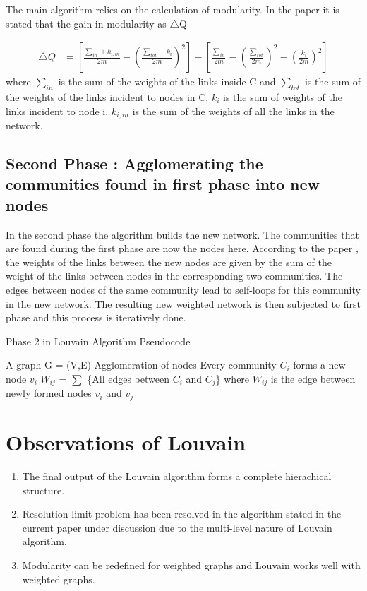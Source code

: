 \par The main algorithm relies on the calculation of modularity.
In the paper it is stated that the gain in modularity as $\bigtriangleup$Q

\begin{equation}
\begin{split}
\bigtriangleup Q &= \left[ \frac{\sum_{in} + k_{i,in}}{2m} - \left( \frac{\sum_{tot} + k_{i}}{2m} \right)^2 \right] - \left[ \frac{\sum_{in}}{2m} - \left( \frac{\sum_{tot}}{2m} \right)^2 - \left( \frac{k_i}{2m} \right)^2 \right]
\end{split}
\end{equation}
where $\sum_{in}$ is the sum of the weights of the links inside C and $\sum_{tot}$ is the sum of the weights of the links incident to nodes in C, $k_i$ is the sum of weights of the links incident to node i, $k_{i,in}$ is the sum of the weights  of all the links in the network.

\subsection{Second Phase : Agglomerating the communities found in first phase into new nodes}
In the second phase the algorithm builds the new network. The communities that are found during the first phase are now the nodes here. According to the paper \cite{Louvain}, the weights of the links between the new nodes are given by the sum of the weight of the links between nodes in the corresponding two communities. The edges between nodes of the same community lead to self-loops for this community in the new network. The resulting new weighted network is then subjected to first phase  and this process is iteratively done. 
\begin{algorithm}[H]

\caption{Phase 2 in Louvain Algorithm Pseudocode}
\begin{algorithmic} 
\REQUIRE A graph G = (V,E)
\ENSURE Agglomeration of nodes
\STATE Every community $C_i$ forms a new node $v_i$
\STATE $W_{ij}$ = $\sum$ \{All edges between $C_i$ and $C_j$\} where $W_{ij}$ is the edge between newly formed nodes $v_i$ and $v_j$
\end{algorithmic}
\end{algorithm}
\section{Observations of Louvain}
\begin{enumerate}
\item The final output of the Louvain algorithm forms a complete hierachical structure.
\item Resolution limit problem \cite{ResolLimit} has been resolved in the algorithm stated in the current paper under discussion \cite{Louvain} due to the multi-level nature of Louvain algorithm.
\item Modularity can be redefined for weighted graphs and Louvain works well with weighted graphs.
\end{enumerate}

